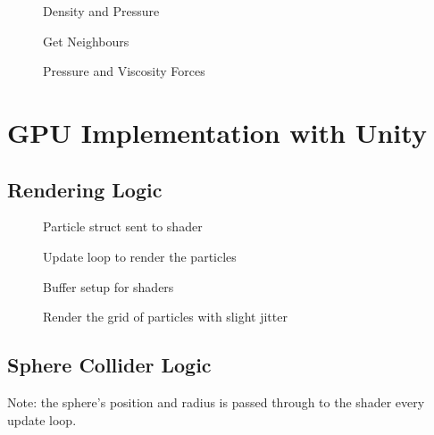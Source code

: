 \documentclass[a4paper, 12pt]{article}
\newcommand{\wideimage}[2][]{%
  \makebox[\textwidth][c]{\texttt{[image: \#2]}}%
}
\begin{document}
    \begin{figure}[H]
        \wideimage[]{densityPressureCPU.png}
        \caption{Density and Pressure}
    \end{figure}

    \begin{figure}[H]
        \wideimage[]{getNeighboursCPU.png}
        \caption{Get Neighbours}
    \end{figure}

    \begin{figure}[H]
        \wideimage[]{pressureViscosityForce.png}
        \caption{Pressure and Viscosity Forces}
    \end{figure}
    
    \section{GPU Implementation with Unity}

    \subsection{Rendering Logic}

    \begin{figure}[H]
        \wideimage[width=0.85\textwidth]{particleGPU.png}
        \caption{Particle struct sent to shader}
    \end{figure}

    \begin{figure}[H]
        \wideimage[width=0.85\textwidth]{renderGPU.png}
        \caption{Update loop to render the particles}
    \end{figure}

    \begin{figure}[H]
        \wideimage[]{setupBuffersGPU.png}
        \caption{Buffer setup for shaders}
    \end{figure}

    \begin{figure}[H]
        \wideimage[]{gridParticlesGPU.png}
        \caption{Render the grid of particles with slight jitter}
    \end{figure}

    \subsection{Sphere Collider Logic}

    Note: the sphere's position and radius is passed through to the shader every update loop.
\end{document}
